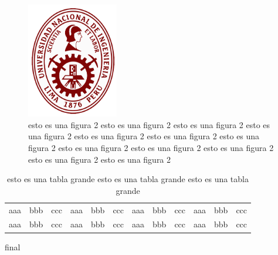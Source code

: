\documentclass{report}
\begin{document}
\begin{figure}
\centering
\includegraphics[width=4cm]{uni}
\caption{esto es una figura 2 esto es una figura 2 esto es una figura 2 esto es una figura 2 esto es una figura 2 esto es una figura 2 esto es una figura 2 esto es una figura 2 esto es una figura 2 esto es una figura 2 esto es una figura 2 esto es una figura 2}
\end{figure}

\begin{table}
	\centering
\caption{esto es una tabla grande esto es una tabla grande esto es una tabla grande}
	\begin{tabular}{*{12}{c}}
		aaa & bbb & ccc & aaa & bbb & ccc &aaa & bbb & ccc &aaa & bbb & ccc  \\
		aaa & bbb & ccc & aaa & bbb & ccc &aaa & bbb & ccc &aaa & bbb & ccc  \\
	\end{tabular}
\end{table}

\hypertarget{aa}{final}
\end{document}

